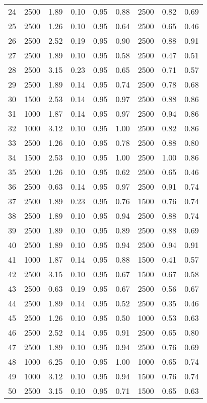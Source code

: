 \begin{longtable}[c]{ccccccccc}
24 &  2500 &  1.89 &  0.10 &  0.95 &  0.88 &  2500 &  0.82 &  0.69 \\
25 &  2500 &  1.26 &  0.10 &  0.95 &  0.64 &  2500 &  0.65 &  0.46 \\
26 &  2500 &  2.52 &  0.19 &  0.95 &  0.90 &  2500 &  0.88 &  0.91 \\
27 &  2500 &  1.89 &  0.10 &  0.95 &  0.58 &  2500 &  0.47 &  0.51 \\
28 &  2500 &  3.15 &  0.23 &  0.95 &  0.65 &  2500 &  0.71 &  0.57 \\
29 &  2500 &  1.89 &  0.14 &  0.95 &  0.74 &  2500 &  0.78 &  0.68 \\
30 &  1500 &  2.53 &  0.14 &  0.95 &  0.97 &  2500 &  0.88 &  0.86 \\
31 &  1000 &  1.87 &  0.14 &  0.95 &  0.97 &  2500 &  0.94 &  0.86 \\
32 &  1000 &  3.12 &  0.10 &  0.95 &  1.00 &  2500 &  0.82 &  0.86 \\
33 &  2500 &  1.26 &  0.10 &  0.95 &  0.78 &  2500 &  0.88 &  0.80 \\
34 &  1500 &  2.53 &  0.10 &  0.95 &  1.00 &  2500 &  1.00 &  0.86 \\
35 &  2500 &  1.26 &  0.10 &  0.95 &  0.62 &  2500 &  0.65 &  0.46 \\
36 &  2500 &  0.63 &  0.14 &  0.95 &  0.97 &  2500 &  0.91 &  0.74 \\
37 &  2500 &  1.89 &  0.23 &  0.95 &  0.76 &  1500 &  0.76 &  0.74 \\
38 &  2500 &  1.89 &  0.10 &  0.95 &  0.94 &  2500 &  0.88 &  0.74 \\
39 &  2500 &  1.89 &  0.10 &  0.95 &  0.89 &  2500 &  0.88 &  0.69 \\
40 &  2500 &  1.89 &  0.10 &  0.95 &  0.94 &  2500 &  0.94 &  0.91 \\
41 &  1000 &  1.87 &  0.14 &  0.95 &  0.88 &  1500 &  0.41 &  0.57 \\
42 &  2500 &  3.15 &  0.10 &  0.95 &  0.67 &  1500 &  0.67 &  0.58 \\
43 &  2500 &  0.63 &  0.19 &  0.95 &  0.67 &  2500 &  0.56 &  0.67 \\
44 &  2500 &  1.89 &  0.14 &  0.95 &  0.52 &  2500 &  0.35 &  0.46 \\
45 &  2500 &  1.26 &  0.10 &  0.95 &  0.50 &  1000 &  0.53 &  0.63 \\
46 &  2500 &  2.52 &  0.14 &  0.95 &  0.91 &  2500 &  0.65 &  0.80 \\
47 &  2500 &  1.89 &  0.10 &  0.95 &  0.94 &  2500 &  0.76 &  0.69 \\
48 &  1000 &  6.25 &  0.10 &  0.95 &  1.00 &  1000 &  0.65 &  0.74 \\
49 &  1000 &  3.12 &  0.10 &  0.95 &  0.94 &  1500 &  0.76 &  0.74 \\
50 &  2500 &  3.15 &  0.10 &  0.95 &  0.71 &  1500 &  0.65 &  0.63 \\
\bottomrule
\end{longtable}

